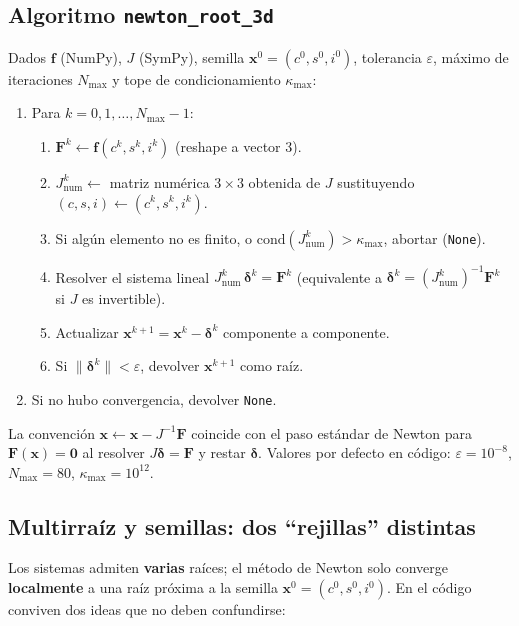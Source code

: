 \documentclass[11pt,a4paper]{article}
\begin{document}
\subsection{Algoritmo \texttt{newton\_root\_3d}}

Dados $\mathbf{f}$ (NumPy), $J$ (SymPy), semilla $\mathbf{x}^0=(c^0,s^0,i^0)$, tolerancia $\varepsilon$, máximo de iteraciones $N_{\max}$ y tope de condicionamiento $\kappa_{\max}$:

\begin{enumerate}[leftmargin=*]
  \item Para $k=0,1,\ldots,N_{\max}-1$:
  \begin{enumerate}[label=\alph*),leftmargin=*]
    \item $\mathbf{F}^k \leftarrow \mathbf{f}(c^k,s^k,i^k)$ (reshape a vector 3).
    \item $J_{\mathrm{num}}^k \leftarrow$ matriz numérica $3\times 3$ obtenida de $J$ sustituyendo $(c,s,i)\leftarrow(c^k,s^k,i^k)$.
    \item Si algún elemento no es finito, o $\mathrm{cond}(J_{\mathrm{num}}^k)>\kappa_{\max}$, abortar (\texttt{None}).
    \item Resolver el sistema lineal $J_{\mathrm{num}}^k\,\boldsymbol{\delta}^k = \mathbf{F}^k$ (equivalente a $\boldsymbol{\delta}^k=(J_{\mathrm{num}}^k)^{-1}\mathbf{F}^k$ si $J$ es invertible).
    \item Actualizar $\mathbf{x}^{k+1}=\mathbf{x}^k-\boldsymbol{\delta}^k$ componente a componente.
    \item Si $\|\boldsymbol{\delta}^k\|<\varepsilon$, devolver $\mathbf{x}^{k+1}$ como raíz.
  \end{enumerate}
  \item Si no hubo convergencia, devolver \texttt{None}.
\end{enumerate}

La convención $\mathbf{x}\leftarrow \mathbf{x}-J^{-1}\mathbf{F}$ coincide con el paso estándar de Newton para $\mathbf{F}(\mathbf{x})=\mathbf{0}$ al resolver $J\boldsymbol{\delta}=\mathbf{F}$ y restar $\boldsymbol{\delta}$. Valores por defecto en código: $\varepsilon=10^{-8}$, $N_{\max}=80$, $\kappa_{\max}=10^{12}$.

\subsection{Multirraíz y semillas: dos ``rejillas'' distintas}

Los sistemas admiten \textbf{varias} raíces; el método de Newton solo converge \textbf{localmente} a una raíz próxima a la semilla $\mathbf{x}^0=(c^0,s^0,i^0)$. En el código conviven dos ideas que no deben confundirse:
\end{document}
